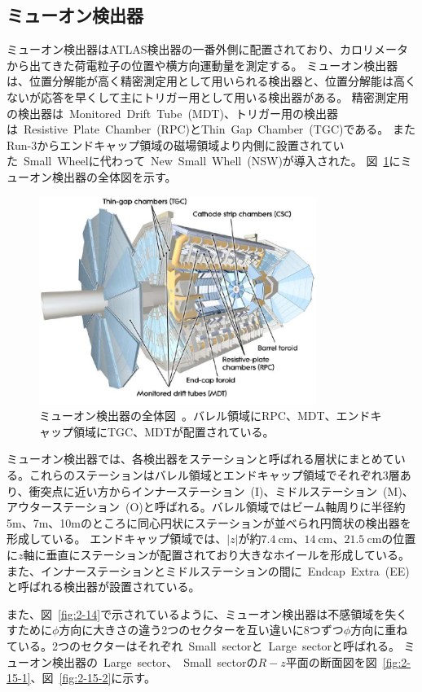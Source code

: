 \subsection{ミューオン検出器}\label{section2-2-5}
ミューオン検出器はATLAS検出器の一番外側に配置されており、カロリメータから出てきた荷電粒子の位置や横方向運動量を測定する。
ミューオン検出器は、位置分解能が高く精密測定用として用いられる検出器と、位置分解能は高くないが応答を早くして主にトリガー用として用いる検出器がある。
精密測定用の検出器は~Monitored~Drift~Tube~(MDT)、トリガー用の検出器は~Resistive~Plate~Chamber~(RPC)とThin~Gap~Chamber~(TGC)である。
またRun-3からエンドキャップ領域の磁場領域より内側に設置されていた~Small~Wheelに代わって~New~Small~Whell~(NSW)が導入された。
図~\ref{fig:2-13}にミューオン検出器の全体図を示す。

\begin{figure}[h]
  \centering
  \includegraphics[clip, width=9cm]{fig/2/muondetector.pdf}
  \caption{ミューオン検出器の全体図~\cite{Aad:1129811}。バレル領域にRPC、MDT、エンドキャップ領域にTGC、MDTが配置されている。}
  \label{fig:2-13}
\end{figure}

ミューオン検出器では、各検出器をステーションと呼ばれる層状にまとめている。これらのステーションはバレル領域とエンドキャップ領域でそれぞれ3層あり、衝突点に近い方からインナーステーション~(I)、ミドルステーション~(M)、アウターステーション~(O)と呼ばれる。バレル領域ではビーム軸周りに半径約5m、7m、10mのところに同心円状にステーションが並べられ円筒状の検出器を形成している。
エンドキャップ領域では、$|z|$が約$\SI{7.4}{\cm}$、$\SI{14}{\cm}$、$\SI{21.5}{\cm}$の位置に$z$軸に垂直にステーションが配置されており大きなホイールを形成している。また、インナーステーションとミドルステーションの間に~Endcap~Extra~(EE)と呼ばれる検出器が設置されている。

また、図~\ref{fig:2-14}で示されているように、ミューオン検出器は不感領域を失くすために$\phi$方向に大きさの違う2つのセクターを互い違いに8つずつ$\phi$方向に重ねている。2つのセクターはそれぞれ~Small~sectorと~Large~sectorと呼ばれる。
ミューオン検出器の~Large~sector、~Small~sectorの$R-z$平面の断面図を図~\ref{fig:2-15-1}、図~\ref{fig:2-15-2}に示す。

